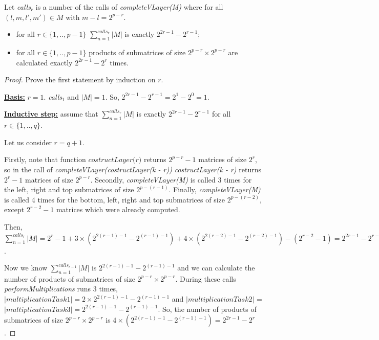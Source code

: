 \begin{lemma}
Let \textit{calls$_{r}$} is a number of the calls of \textit{completeVLayer(M)} where for all $(l, m, l', m') \in M$ with $m - l = 2^{p - r}$.
\begin{itemize}
 \item for all $r \in \{ 1, .., p - 1\}$  $\sum_{n=1}^{calls_r}{|M|}$ is exactly $2^{2r - 1} - 2^{r - 1}$;
 \item for all $r \in \{ 1, .., p - 1\}$ products of submatrices of size $2^{p - r} \times 2^{p - r}$ are calculated exactly $2^{2r - 1} - 2^{r}$ times.
\end{itemize}
\end{lemma}

\begin{proof}

Prove the first statement by induction on $r$.

\underline{\textbf{Basis:}} $r = 1$. \textit{calls$_{1}$} and $|M| = 1$. So, $2^{2r - 1} - 2^{r - 1} = 2^1 - 2^0 = 1$.

\underline{\textbf{Inductive step:}} assume that $\sum_{n=1}^{calls_r}{|M|}$ is exactly $2^{2r - 1} - 2^{r - 1}$ for all $r \in \{ 1, .., q\}$.

Let us consider $r = q + 1$.

Firstly, note that function $\textit{costructLayer(r)}$ returns $2^{p - r} - 1$ matrices of size $2^r$, so in the call of \textit{completeVLayer(costructLayer(k - r))}  \textit{costructLayer(k - r)} returns $2^r - 1$ matrices of size $2^{p - r}$. 
Secondly, \textit{completeVLayer(M)} is called 3 times for the left, right and top submatrices of size $2^{p - (r - 1)}$. Finally, \textit{completeVLayer(M)} is called 4 times for the bottom, left, right and top submatrices of size $2^{p - (r - 2)}$, except $2^{r - 2} - 1$ matrices which were already computed.

Then, $\sum_{n=1}^{calls_r}{|M|} = 2^{r} - 1 + 3 \times (2^{2(r - 1) - 1} - 2^{(r - 1) - 1}) + 4 \times (2^{2(r - 2) - 1} - 2^{(r - 2) - 1}) - (2^{r - 2} - 1) = 2^{2r - 1} - 2^{r - 1}$.

Now we know $\sum_{n=1}^{calls_{r-1}}{|M|}$  is $2^{2(r - 1) - 1} - 2^{(r - 1) - 1}$ and we can calculate the number of products of submatrices of size $2^{p - r} \times 2^{p - r}$. 
During these calls \textit{performMultiplications} runs 3 times, $|multiplicationTask1| = 2 \times 2^{2(r - 1) - 1} - 2^{(r - 1) - 1}$ and $|multiplicationTask2|$ = $|multiplicationTask3| = 2^{2(r - 1) - 1} - 2^{(r - 1) - 1}$. So, the number of products of submatrices of size $2^{p - r} \times 2^{p - r}$ is $ 4 \times (2^{2(r - 1) - 1} - 2^{(r - 1) - 1}) = 2^{2r - 1} - 2^{r}$.
\end{proof}

